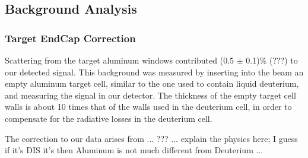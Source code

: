 
\subsection{Background Analysis}

\subsubsection{Target EndCap Correction}

Scattering from the target aluminum windows contributed
(0.5 $\pm$ 0.1)\% (???) to our detected signal.
This background was measured by 
inserting into the beam an empty
aluminum target cell, similar to the one used to
contain liquid deuterium, and measuring the 
signal in our detector. 
The thickness of the empty target cell walls is about 10 times
that of the walls used in the deuterium cell, in
order to compensate for the radiative
losses in the deuterium cell.  

The correction to our data arises from ... ??? ... explain the
physics here; I guess if it's DIS it's then Aluminum is
not much different from Deuterium ...
